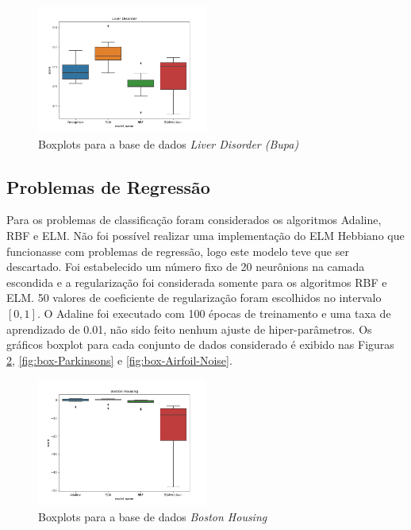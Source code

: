 \documentclass[conference]{IEEEtran}
\begin{document}
	\begin{figure}[thpbh]
		\centering
		\includegraphics[width=0.5\textwidth]{figures/Liver Disorder_scores.png}
		\caption{Boxplots para a base de dados \textit{Liver Disorder (Bupa)}}
		\label{fig:box-Liver-Disorder}
	\end{figure}	
		
	
	\subsection{Problemas de Regressão}
	Para os problemas de classificação foram considerados os algoritmos Adaline, RBF e ELM. Não foi possível realizar uma implementação do ELM Hebbiano que funcionasse com problemas de regressão, logo este modelo teve que ser descartado. Foi estabelecido um número fixo de 20 neurônions na camada escondida e a regularização foi considerada somente para os algoritmos RBF e ELM. 50 valores de coeficiente de regularização foram escolhidos no intervalo $[0,1]$. O Adaline foi executado com 100 épocas de treinamento e uma taxa de aprendizado de 0.01, não sido feito nenhum ajuste de hiper-parâmetros. Os gráficos boxplot para cada conjunto de dados considerado é exibido nas Figuras \ref{fig:box-Boston-Housing}, \ref{fig:box-Parkinsons} e \ref{fig:box-Airfoil-Noise}.

	\begin{figure}[thpbh]
		\centering
		\includegraphics[width=0.5\textwidth]{figures/Boston Housing_scores.png}
		\caption{Boxplots para a base de dados \textit{Boston Housing}}
		\label{fig:box-Boston-Housing}
	\end{figure}
	
\end{document}
